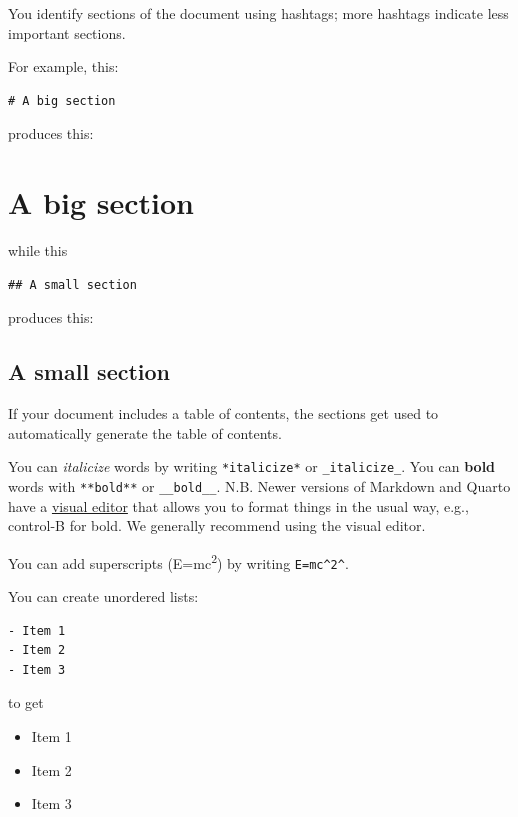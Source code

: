 \documentclass[
  letterpaper,
  DIV=11,
  numbers=noendperiod]{scrreprt}
\providecommand{\tightlist}{%
  \setlength{\itemsep}{0pt}\setlength{\parskip}{0pt}}\usepackage{longtable,booktabs,array}
\begin{document}
You identify sections of the document using hashtags; more hashtags
indicate less important sections.

For example, this:

\begin{verbatim}
# A big section
\end{verbatim}

produces this:

\hypertarget{a-big-section}{%
\chapter{A big section}\label{a-big-section}}

while this

\begin{verbatim}
## A small section
\end{verbatim}

produces this:

\hypertarget{a-small-section}{%
\section{A small section}\label{a-small-section}}

If your document includes a table of contents, the sections get used to
automatically generate the table of contents.

You can \emph{italicize} words by writing \texttt{*italicize*} or
\texttt{\_italicize\_}. You can \textbf{bold} words with
\texttt{**bold**} or \texttt{\_\_bold\_\_}. N.B. Newer versions of
Markdown and Quarto have a
\href{https://rstudio.github.io/visual-markdown-editing/}{visual editor}
that allows you to format things in the usual way, e.g., control-B for
bold. We generally recommend using the visual editor.

You can add superscripts (E=mc\textsuperscript{2}) by writing
\texttt{E=mc\^{}2\^{}}.

You can create unordered lists:

\begin{verbatim}
- Item 1
- Item 2
- Item 3
\end{verbatim}

to get

\begin{itemize}
\tightlist
\item
  Item 1
\item
  Item 2
\item
  Item 3
\end{itemize}
\end{document}
